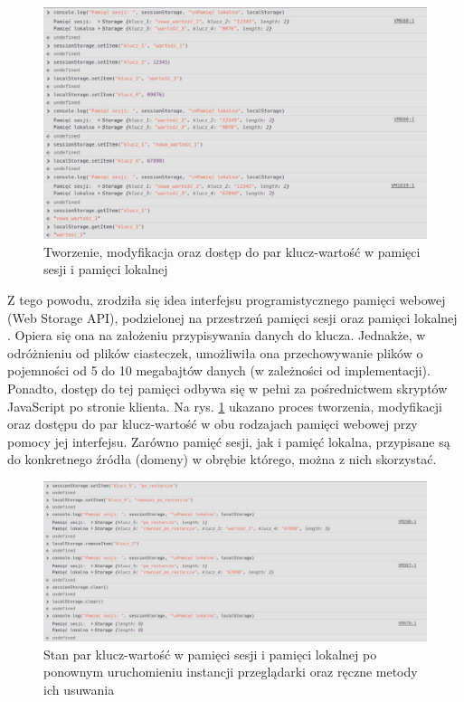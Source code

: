 \begin{figure}[!htbp] 
    \centering
    \includegraphics[width=\textwidth]{img/chapter3/storage.setting_values.png}
    \caption{Tworzenie, modyfikacja oraz dostęp do par klucz-wartość w pamięci sesji i pamięci lokalnej}
    \label{fig:storage.setting_values}
\end{figure}

Z tego powodu, zrodziła się idea interfejsu programistycznego pamięci webowej (Web Storage API), podzielonej na przestrzeń pamięci sesji oraz pamięci lokalnej \cite{web_storage.docs}. Opiera się ona na założeniu przypisywania danych do klucza. Jednakże, w odróżnieniu od plików ciasteczek, umożliwiła ona przechowywanie plików o pojemności od 5 do 10 megabajtów danych (w zależności od implementacji). Ponadto, dostęp do tej pamięci odbywa się w pełni za pośrednictwem skryptów JavaScript po stronie klienta. Na rys. \ref{fig:storage.setting_values} ukazano proces tworzenia, modyfikacji oraz dostępu do par klucz-wartość w obu rodzajach pamięci webowej przy pomocy jej interfejsu. Zarówno pamięć sesji, jak i pamięć lokalna, przypisane są do konkretnego źródła (domeny) w obrębie którego, można z nich skorzystać.

\begin{figure}[!htbp] 
    \centering
    \includegraphics[width=\textwidth]{img/chapter3/storage.removing_values.png}
    \caption{Stan par klucz-wartość w pamięci sesji i pamięci lokalnej po ponownym uruchomieniu instancji przeglądarki oraz ręczne metody ich usuwania}
    \label{fig:storage.removing_values}
\end{figure}

